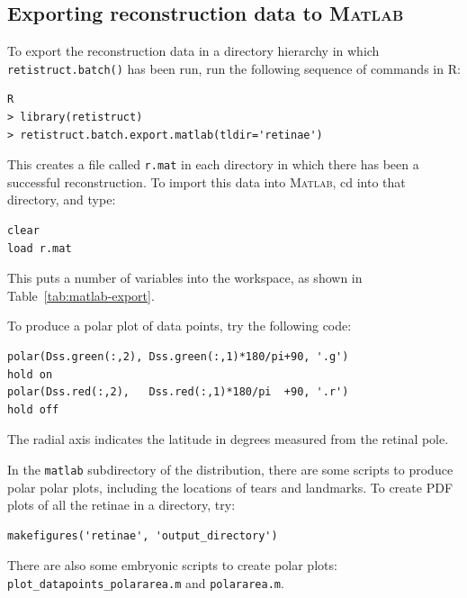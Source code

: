\documentclass{article}
\begin{document}
\subsection{Exporting reconstruction data to \textsc{Matlab}}
\label{retistruct-manual:sec:export-reconstr-data}

To export the reconstruction data in a directory hierarchy in which
\texttt{retistruct.batch()} has been run, run the following sequence
of commands in R:
\begin{verbatim}
R
> library(retistruct)
> retistruct.batch.export.matlab(tldir='retinae')
\end{verbatim}
This creates a file called \texttt{r.mat} in each directory in which
there has been a successful reconstruction. To import this data into
\textsc{Matlab}, cd into that directory, and type:
\begin{verbatim}
clear
load r.mat
\end{verbatim}
This puts a number of variables into the workspace, as shown in
Table~\ref{tab:matlab-export}.

To produce a polar plot of data points, try the following code:
\begin{verbatim}
polar(Dss.green(:,2), Dss.green(:,1)*180/pi+90, '.g')
hold on
polar(Dss.red(:,2),   Dss.red(:,1)*180/pi  +90, '.r')
hold off
\end{verbatim}
The radial axis indicates the latitude in degrees measured from the
retinal pole.

In the \texttt{matlab} subdirectory of the distribution, there are
some scripts to produce polar polar plots, including the locations of
tears and landmarks. To create PDF plots of all the retinae in a
directory, try:
\begin{verbatim}
makefigures('retinae', 'output_directory')
\end{verbatim}

There are also some embryonic scripts to create polar plots:
\texttt{plot\_datapoints\_polararea.m} and \texttt{polararea.m}.
\end{document}

